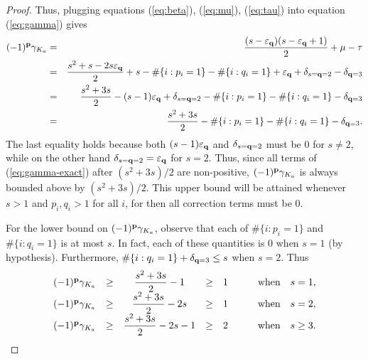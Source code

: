\documentclass[11pt]{amsart}
\newcommand{\p}{{\bf p}}
\newcommand{\q}{{\bf q}}
\newcommand{\eq}{\varepsilon_{\q}}
\theoremstyle{plain}
\theoremstyle{definition}
\begin{document}
\begin{proof}
Thus, plugging equations (\ref{eq:beta}), (\ref{eq:mu}), (\ref{eq:tau}) into equation 
(\ref{eq:gamma}) gives
\begin{eqnarray}
(-1)^{\p} \gamma_{K_a} &=&
\frac{ (s-\eq) (s-\eq+1)}{2}  +\mu - \tau \notag \\
 &=&
\frac{s^2 + s - 2s \eq}{2}  + s  -     \#\{i : p_i = 1 \}   -    \#\{i : q_i = 1 \}   +    \eq    +   \delta_{s=\q=2}   -   \delta_{\q = 3} \notag \\
 &=&
\frac{s^2 + 3s}{2}   - (s-1)\eq +   \delta_{s=\q=2} -  \#\{i : p_i = 1 \}   -    \#\{i : q_i = 1 \}         -   \delta_{\q = 3} \notag \\
 &=&
\frac{s^2 + 3s}{2}     -  \#\{i : p_i = 1 \}   -    \#\{i : q_i = 1 \}       -   \delta_{\q = 3}.
\label{eq:gamma-exact}
\end{eqnarray}
The last equality holds because both $(s-1)\eq$ and  $\delta_{s=\q=2}$ must be $0$ for $s \neq 2$, while on the other hand $\delta_{s=\q=2} = \eq$ for $s = 2$. Thus, since all terms of (\ref{eq:gamma-exact}) after $(s^2+3s)/2$ are non-positive, $(-1)^{\p} \gamma_{K_a}$ is always bounded above by $(s^2+3s)/2$. This upper bound will be 
attained whenever $s>1$ and $p_i, q_i >1$ for all $i$, for then all correction terms must be $0$.

For the lower bound on $(-1)^{\p} \gamma_{K_a}$, observe that each of $ \#\{i : p_i = 1 \}$ and $\#\{i : q_i = 1 \} $ is at most $s$. In fact, each of these quantities is $0$ when $s=1$ (by hypothesis). Furthermore, $\#\{i : q_i = 1 \}   +   \delta_{\q = 3} \leq s$ when $s=2$. Thus
$$
{\setlength{\jot}{1.3ex}
\begin{array}{r c c c c c l}
(-1)^{\p} \gamma_{K_a}  &\geq &  \dfrac{s^2 + 3s}{2}    -1 &\geq &  1 & \qquad \mbox{when} & s = 1, \\
(-1)^{\p} \gamma_{K_a}  &\geq &  \dfrac{s^2 + 3s}{2}   - 2s &\geq &  1 & \qquad \mbox{when} & s = 2,\\
(-1)^{\p} \gamma_{K_a}  &\geq &  \dfrac{s^2 + 3s}{2}   - 2s -1 &\geq &  2 & \qquad \mbox{when} & s \geq 3.
\end{array}}
$$

\vspace{-3.5ex}
\end{proof}
\end{document}
